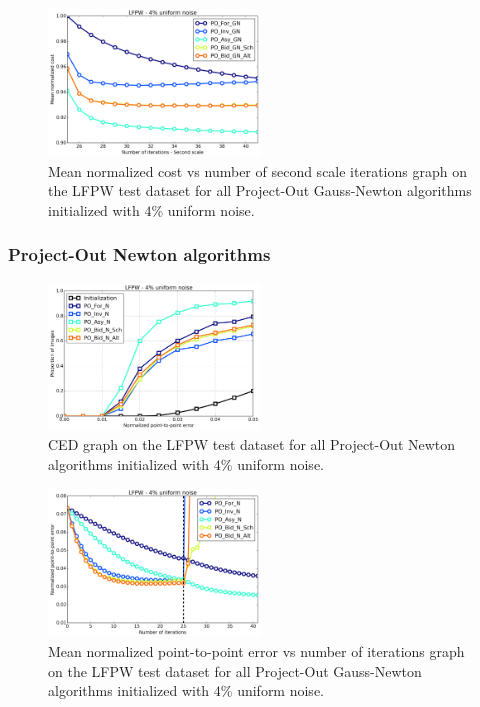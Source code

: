 \begin{figure}[h!]
    \centering
    \includegraphics[width=0.50\textwidth]{experiments/algorithms/po_gn/mean_cost_vs_iters2_po_gn_4.png}
    \caption{Mean normalized cost vs number of second scale iterations graph on the LFPW test dataset for all Project-Out Gauss-Newton algorithms initialized with $4$\% uniform noise.}
    \label{fig:mean_cost_vs_iters2_po_gn_4}
\end{figure}


\subsubsection{Project-Out Newton algorithms}

\begin{figure}[h!]
    \centering
    \includegraphics[width=0.50\textwidth]{experiments/algorithms/po_n/ced_po_n_4.png}
    \caption{CED graph on the LFPW test dataset for all Project-Out Newton algorithms initialized with $4$\% uniform noise.}
    \label{fig:ced_po_gn_4}
\end{figure}

\begin{figure}[h!]
    \centering
    \includegraphics[width=0.50\textwidth]{experiments/algorithms/po_n/mean_error_vs_iters_po_n_4.png}
    \caption{Mean normalized point-to-point error vs number of iterations graph on the LFPW test dataset for all Project-Out Gauss-Newton algorithms initialized with $4$\% uniform noise.}
    \label{fig:mean_error_vs_iters_po_n_4}
\end{figure}

